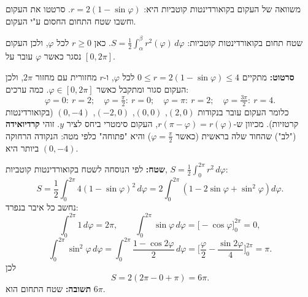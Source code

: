 
\begin{question}
משוואה של העקום בקואורדינטות קוטביות היא: $r=2(1-\sin\varphi)$.
סרטטו את העקום וחשבו שטח התחום החסום ע"י העקום.
\end{question}

\begin{hint}
שטח תחום בקואורדינטות קוטביות: $S=\frac12\int_\alpha^\beta r^2(\varphi)\,d\varphi$. כאן $r\ge0$ לכל $\varphi$, ולכן העקום נסגר כאשר $\varphi$ עובר על $[0,2\pi]$.
\end{hint}

\begin{solution}
\textbf{סרטוט:} מתקיים $0\le r=2(1-\sin\varphi)\le 4$ לכל $\varphi$, ו-$r$ מחזורית עם מחזור $2\pi$, ולכן העקום סגור ומתקבל כאשר $\varphi\in[0,2\pi]$. כמה ערכים:
\[ \varphi=0:\ r=2;\quad \varphi=\tfrac{\pi}{2}:\ r=0;\quad \varphi=\pi:\ r=2;\quad \varphi=\tfrac{3\pi}{2}:\ r=4. \]
כלומר העקום עובר בנקודות $(2,0)$, $(0,0)$, $(-2,0)$, $(0,-4)$ (בקואורדינטות קרטזיות). מכיוון ש-$r(\pi-\varphi)=r(\varphi)$, העקום סימטרי ביחס לציר $y$. זוהי \textbf{קרדיואידה} ("לב") שהחוד שלה בראשית (כאשר $\varphi=\frac\pi2$) והיא "פתוחה" כלפי מטה: הנקודה הרחוקה ביותר היא $(0,-4)$.

\textbf{שטח:} לפי הנוסחה לשטח בקואורדינטות קוטביות, $S=\frac12\int_0^{2\pi}r^2\,d\varphi$:
\[ S = \frac12\int_0^{2\pi}4(1-\sin\varphi)^2\,d\varphi = 2\int_0^{2\pi}\left(1-2\sin\varphi+\sin^2\varphi\right)d\varphi. \]
נחשב כל איבר בנפרד:
\[ \int_0^{2\pi}1\,d\varphi=2\pi,\qquad \int_0^{2\pi}\sin\varphi\,d\varphi = \Big[-\cos\varphi\Big]_0^{2\pi}=0, \]
\[ \int_0^{2\pi}\sin^2\varphi\,d\varphi = \int_0^{2\pi}\frac{1-\cos2\varphi}{2}\,d\varphi = \Big[\frac{\varphi}{2}-\frac{\sin2\varphi}{4}\Big]_0^{2\pi} = \pi. \]
לכן
\[ S = 2\left(2\pi - 0 + \pi\right) = 6\pi. \]
\textbf{תשובה:} שטח התחום הוא $6\pi$.
\end{solution}
